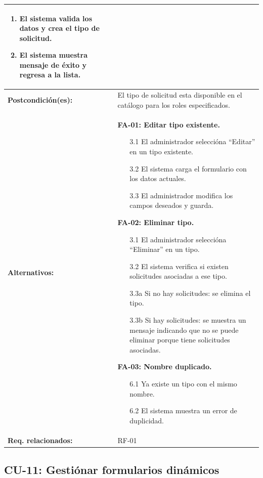 \begin{longtable}{|L{4cm}|L{9.5cm}|}
\begin{enumerate}[nosep, leftmargin=*]
        \item El sistema valida los datos y crea el tipo de solicitud.
        \item El sistema muestra mensaje de éxito y regresa a la lista.
    \end{enumerate} \\
    \hline
    \textbf{Postcondición(es):} & El tipo de solicitud esta disponible en el catálogo para los roles especificados. \\
    \hline
    \textbf{Alternativos:} &
    \textbf{FA-01: Editar tipo existente.}
    \begin{enumerate}[nosep, leftmargin=*]
        \item[3.1] El administrador seleccióna ``Editar'' en un tipo existente.
        \item[3.2] El sistema carga el formulario con los datos actuales.
        \item[3.3] El administrador modifica los campos deseados y guarda.
    \end{enumerate}
    \vspace{0.2cm}
    \textbf{FA-02: Eliminar tipo.}
    \begin{enumerate}[nosep, leftmargin=*]
        \item[3.1] El administrador seleccióna ``Eliminar'' en un tipo.
        \item[3.2] El sistema verifica si existen solicitudes asociadas a ese tipo.
        \item[3.3a] Si no hay solicitudes: se elimina el tipo.
        \item[3.3b] Si hay solicitudes: se muestra un mensaje indicando que no se puede eliminar porque tiene solicitudes asociadas.
    \end{enumerate}
    \vspace{0.2cm}
    \textbf{FA-03: Nombre duplicado.}
    \begin{enumerate}[nosep, leftmargin=*]
        \item[6.1] Ya existe un tipo con el mismo nombre.
        \item[6.2] El sistema muestra un error de duplicidad.
    \end{enumerate} \\
    \hline
    \textbf{Req. relacionados:} & RF-01 \\
    \hline
\end{longtable}

\subsection{CU-11: Gestiónar formularios dinámicos}

